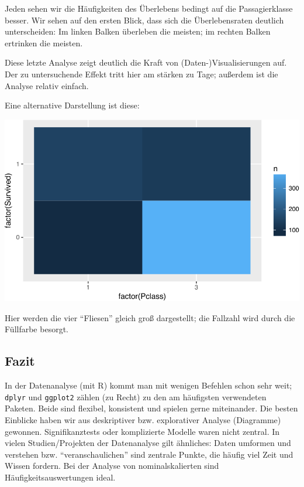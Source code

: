 \documentclass[12pt,ngerman,]{book}
\newenvironment{Shaded}{\begin{snugshade}}{\end{snugshade}}
\newcommand{\KeywordTok}[1]{\textcolor[rgb]{0.13,0.29,0.53}{\textbf{{#1}}}}
\newcommand{\DataTypeTok}[1]{\textcolor[rgb]{0.13,0.29,0.53}{{#1}}}
\newcommand{\StringTok}[1]{\textcolor[rgb]{0.31,0.60,0.02}{{#1}}}
\newcommand{\NormalTok}[1]{{#1}}
\renewenvironment{Shaded}{\begin{kframe}}{\end{kframe}}
\begin{document}
Jeden sehen wir die Häufigkeiten des Überlebens bedingt auf die
Passagierklasse besser. Wir sehen auf den ersten Blick, dass sich die
Überlebensraten deutlich unterscheiden: Im linken Balken überleben die
meisten; im rechten Balken ertrinken die meisten.

Diese letzte Analyse zeigt deutlich die Kraft von
(Daten-)Visualisierungen auf. Der zu untersuchende Effekt tritt hier am
stärken zu Tage; außerdem ist die Analyse relativ einfach.

Eine alternative Darstellung ist diese:

\begin{Shaded}
\end{Shaded}

\begin{center}\includegraphics[width=0.7\linewidth]{075_Fallstudie_Titanic_files/figure-latex/unnamed-chunk-14-1} \end{center}

Hier werden die vier ``Fliesen'' gleich groß dargestellt; die Fallzahl
wird durch die Füllfarbe besorgt.

\subsection{Fazit}\label{fazit-1}

In der Datenanalyse (mit R) kommt man mit wenigen Befehlen schon sehr
weit; \texttt{dplyr} und \texttt{ggplot2} zählen (zu Recht) zu den am
häufigsten verwendeten Paketen. Beide sind flexibel, konsistent und
spielen gerne miteinander. Die besten Einblicke haben wir aus
deskriptiver bzw. explorativer Analyse (Diagramme) gewonnen.
Signifikanztests oder komplizierte Modelle waren nicht zentral. In
vielen Studien/Projekten der Datenanalyse gilt ähnliches: Daten umformen
und verstehen bzw. ``veranschaulichen'' sind zentrale Punkte, die häufig
viel Zeit und Wissen fordern. Bei der Analyse von nominalskalierten sind
Häufigkeitsauswertungen ideal.
\end{document}
